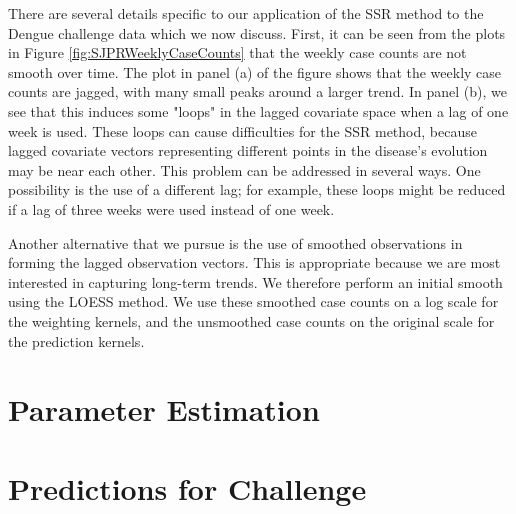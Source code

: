 \documentclass[fleqn]{article}\usepackage[]{graphicx}\usepackage[]{color}
\begin{document}
There are several details specific to our application of the SSR method to the Dengue challenge data which we now discuss.  First, it can be seen from the plots in Figure \ref{fig:SJPRWeeklyCaseCounts} that the weekly case counts are not smooth over time.  The plot in panel (a) of the figure shows that the weekly case counts are jagged, with many small peaks around a larger trend.  In panel (b), we see that this induces some "loops" in the lagged covariate space when a lag of one week is used.  These loops can cause difficulties for the SSR method, because lagged covariate vectors representing different points in the disease's evolution may be near each other.  This problem can be addressed in several ways.  One possibility is the use of a different lag; for example, these loops might be reduced if a lag of three weeks were used instead of one week.

Another alternative that we pursue is the use of smoothed observations in forming the lagged observation vectors.  This is appropriate because we are most interested in capturing long-term trends.  We therefore perform an initial smooth using the LOESS method.  We use these smoothed case counts on a log scale for the weighting kernels, and the unsmoothed case counts on the original scale for the prediction kernels.

\section{Parameter Estimation}
\label{sec:Estimation}



\section{Predictions for Challenge}
\label{sec:PredictionsForChallenge}
\end{document}
